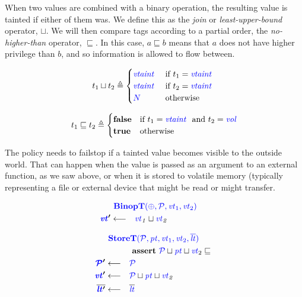 \documentclass[acmsmall,review,anonymous]{acmart}\settopmatter{printfolios=true,printccs=false,printacmref=false}
\begin{document}
When two values are combined with a binary operation, the resulting value is tainted
if either of them was. We define this as the {\em join} or {\em least-upper-bound}
operator, \(\sqcup\). We will then compare tags according to a partial order, the
{\em no-higher-than} operator, \(\sqsubseteq\). In this case, \(a \sqsubseteq b\)
means that \(a\) does not have higher privilege than \(b\), and so information is
allowed to flow between.

\begin{minipage}[t]{.49\textwidth}
\[t_1 \sqcup t_2 \triangleq
\begin{cases}
  \mathit{\color{blue} vtaint ~ } & \textnormal{if } t_1 = \mathit{\color{blue} vtaint ~ } \\
  \mathit{\color{blue} vtaint ~ } & \textnormal{if } t_2 = \mathit{\color{blue} vtaint ~ } \\
  {\color{blue} N} & \textnormal{otherwise} \\
\end{cases}\]
\end{minipage}
\begin{minipage}[t]{.49\textwidth}
\[t_1 \sqsubseteq t_2 \triangleq
\begin{cases}
  \mathbf{false} & \textnormal{if } t_1 = \mathit{\color{blue} vtaint ~ } \textnormal{ and } t_2 = \mathit{\color{blue} vol} \\
  \mathbf{true} & \textnormal{otherwise} \\
\end{cases}\]
\end{minipage}

The policy needs to failstop if a tainted value becomes visible to the outside world.
That can happen when the value is passed as an argument to an external function, as we
saw above, or when it is stored to volatile memory (typically representing a file or external
device that might be read or might transfer.

\begin{minipage}{0.49\textwidth}
  \[\begin{aligned}
  \truledef{\binopt}
  \settag{\vt'}{
    \vt_1 \sqcup \vt_2
  }
  \end{aligned}\]
\end{minipage}
\begin{minipage}{0.49\textwidth}
  \[\begin{aligned}
  \truledef{\storet}
  \assert{\PCT \sqcup \pt \sqcup \vt_2 \sqsubseteq }
  \settag{\PCT'}{\PCT}
  \settag{\vt'}{\PCT \sqcup \pt \sqcup \vt_2}
  \settag{\overline{\lt'}}{\overline{\lt}}
  \end{aligned}\]
\end{minipage}
\end{document}
